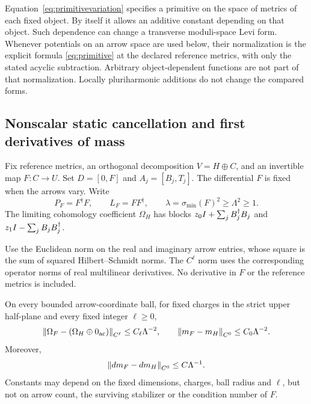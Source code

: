Equation~\eqref{eq:primitivevariation} specifies a primitive on the
space of metrics of each fixed object. By itself it allows an additive
constant depending on that object. Such dependence can change a
transverse moduli-space Levi form. Whenever potentials on an arrow
space are used below, their normalization is the explicit formula
\eqref{eq:primitive} at the declared reference metrics, with only the
stated acyclic subtraction. Arbitrary object-dependent functions are
not part of that normalization. Locally pluriharmonic additions do not
change the compared forms.

\subsection{Nonscalar static cancellation and first derivatives of mass}
Fix reference metrics, an orthogonal decomposition $V=H\oplus C$, and
an invertible map $F:C\to U$. Set $D=[0,F]$ and $A_j=[B_j,T_j]$.
The differential $F$ is fixed when the arrows vary. Write
\[
 P_F=F^\dagger F,\qquad L_F=FF^\dagger,\qquad
 \lambda=\sigma_{\min}(F)^2\geq\Lambda^2\geq1.
\]
The limiting cohomology coefficient $\Omega_H$ has blocks
$z_0I+\sum_jB_j^\dagger B_j$ and
$z_1I-\sum_jB_jB_j^\dagger$.

Use the Euclidean norm on the real and imaginary arrow entries,
whose square is the sum of squared Hilbert--Schmidt norms.
The $C^\ell$ norm uses the corresponding operator norms of real
multilinear derivatives. No derivative in $F$ or the reference metrics
is included.

\begin{proposition}\label{prop:massC1}
On every bounded arrow-coordinate ball, for fixed charges in the strict
upper half-plane and every fixed integer $\ell\geq0$,
\begin{equation}\label{eq:staticCk}
 \left\lVert\Omega_F-(\Omega_H\oplus0_{\mathrm{ac}})\right\rVert_{C^\ell}
 \leq C_\ell\Lambda^{-2},\qquad
 \left\lVert m_F-m_H\right\rVert_{C^0}\leq C_0\Lambda^{-2}.
\end{equation}
Moreover,
\begin{equation}\label{eq:massC1}
 \left\lVert dm_F-dm_H\right\rVert_{C^0}\leq C\Lambda^{-1}.
\end{equation}
Constants may depend on the fixed dimensions, charges, ball radius and
$\ell$, but not on arrow count, the surviving stabilizer or the condition
number of $F$.
\end{proposition}

